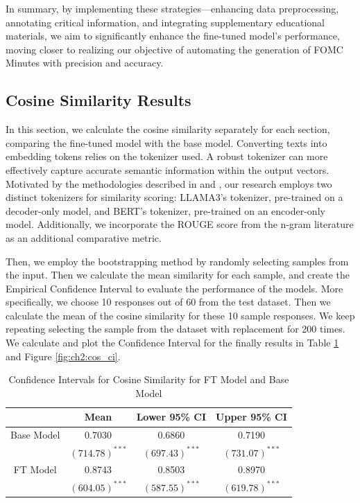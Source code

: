 In summary, by implementing these strategies—enhancing data preprocessing, annotating critical information, and integrating supplementary educational materials, we aim to significantly enhance the fine-tuned model's performance, moving closer to realizing our objective of automating the generation of FOMC Minutes with precision and accuracy.


\subsection{Cosine Similarity Results}

In this section, we calculate the cosine similarity separately for each section, comparing the fine-tuned model with the base model. Converting texts into embedding tokens relies on the tokenizer used. A robust tokenizer can more effectively capture accurate semantic information within the output vectors. Motivated by the methodologies described in \cite{aynetdinov2024semscore} and \cite{zhang2019bertscore}, our research employs two distinct tokenizers for similarity scoring: LLAMA3's tokenizer, pre-trained on a decoder-only model, and BERT's tokenizer, pre-trained on an encoder-only model. Additionally, we incorporate the ROUGE score from the n-gram literature as an additional comparative metric.


Then, we employ the bootstrapping method by randomly selecting samples from the input. Then we calculate the mean similarity for each sample, and create the Empirical Confidence Interval to evaluate the performance of the models. More specifically, we choose 10 responses out of 60 from the test dataset. Then we calculate the mean of the cosine similarity for these 10 sample responses. We keep repeating selecting the sample from the dataset with replacement for 200 times. We calculate and plot the Confidence Interval for the finally results in Table \ref{tab:ch2:cos_ci} and Figure \ref{fig:ch2:cos_ci}.

\begin{table}[h]
    \scriptsize
    \centering
    \begin{tabular}{c  c c c}
      \toprule
        &Mean & Lower 95\% CI& Upper 95\% CI \\
        \hline
        Base Model& 0.7030& 0.6860& 0.7190\\
        & $(714.78)^{***}$& $(697.43)^{***}$& $(731.07)^{***}$\\
       FT Model& 0.8743& 0.8503& 0.8970\\
        &$(604.05)^{***}$& $(587.55)^{***}$& $(619.78)^{***}$\\
       \bottomrule
    \end{tabular}
    \caption{Confidence Intervals for Cosine Similarity for FT Model and Base Model}
    \label{tab:ch2:cos_ci}
\end{table}


